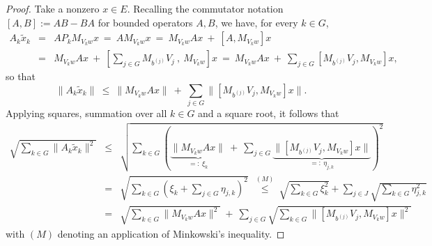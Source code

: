 \documentclass[10pt,a4paper]{amsart}
\begin{document}
\begin{proof}
Take a nonzero $x\in E$. Recalling the commutator notation $[A,B]:=AB-BA$ for bounded operators $A,B$, we have, for every $k\in G$,
\begin{eqnarray*}
A_k\tilde x_k &=& AP_kM_{V_kw}x \ =\ AM_{V_kw}x \ =\ M_{V_kw}Ax\ +\ [A,M_{V_kw}]x\\
&=& M_{V_kw}Ax\ +\ \left[\sum_{j\in G} M_{b^{(j)}}V_j\ ,\ M_{V_kw}\right]x
\ =\ M_{V_kw}Ax\ +\ \sum_{j\in G} [M_{b^{(j)}}V_j,M_{V_kw}]x,
\end{eqnarray*}
so that
\[
\|A_k\tilde x_k\| \ \le\ \|M_{V_kw}Ax\|\ +\ \sum_{j\in G} \|[M_{b^{(j)}}V_j,M_{V_kw}]x\|.
\]
Applying squares, summation over all $k\in G$ and a square root, it follows that
\begin{eqnarray}
\sqrt{\sum_{k\in G} \|A_k\tilde x_k\|^2} &\le&
\sqrt{\sum_{k\in G}\left(\underbrace{\|M_{V_kw}Ax\|}_{=:\ \xi_k}\ +\ \sum_{j\in G} \underbrace{\|[M_{b^{(j)}}V_j,M_{V_kw}]x\|}_{=:\ \eta_{j,k}}\right)^2}\nonumber\\ 
&=& \sqrt{\sum_{k\in G}(\xi_k+\sum_{j\in G} \eta_{j,k})^2}\ 
\ \stackrel{(M)}\le%
\ \sqrt{\sum_{k\in G} \xi_k^2}+\sum_{j\in J}\sqrt{\sum_{k\in G}\eta_{j,k}^2}\nonumber\\
&=& \sqrt{\sum_{k\in G}\|M_{V_kw}Ax\|^2}\ +\ \sum_{j\in G}\sqrt{\sum_{k\in G}\|[M_{b^{(j)}}V_j,M_{V_kw}]x\|^2} \label{eq:tag1}
\end{eqnarray}
with $(M)$ denoting an application of Minkowski's inequality.


\end{proof}
\end{document}
